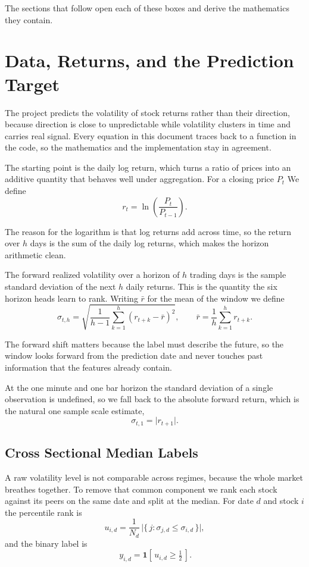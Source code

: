 \documentclass[12pt,letterpaper]{article}
\begin{document}
The sections that follow open each of these boxes and derive the mathematics
they contain.

\clearpage
\section{Data, Returns, and the Prediction Target}

The project predicts the volatility of stock returns rather than their
direction, because direction is close to unpredictable while volatility
clusters in time and carries real signal. Every equation in this document
traces back to a function in the code, so the mathematics and the
implementation stay in agreement.

The starting point is the daily log return, which turns a ratio of prices into
an additive quantity that behaves well under aggregation. For a closing price
$P_t$ We define
\[
r_t = \ln\!\left(\frac{P_t}{P_{t-1}}\right).
\]

The reason for the logarithm is that log returns add across time, so the return
over $h$ days is the sum of the daily log returns, which makes the horizon
arithmetic clean.

The forward realized volatility over a horizon of $h$ trading days is the
sample standard deviation of the next $h$ daily returns. This is the quantity
the six horizon heads learn to rank. Writing $\bar r$ for the mean of the window
we define
\[
\sigma_{t,h} = \sqrt{\frac{1}{h-1}\sum_{k=1}^{h} \left(r_{t+k} - \bar r\right)^2 },
\qquad
\bar r = \frac{1}{h}\sum_{k=1}^{h} r_{t+k}.
\]

The forward shift matters because the label must describe the future, so the
window looks forward from the prediction date and never touches past
information that the features already contain.

At the one minute and one bar horizon the standard deviation of a single
observation is undefined, so we fall back to the absolute forward return, which
is the natural one sample scale estimate,
\[
\sigma_{t,1} = \lvert r_{t+1} \rvert .
\]

\subsection{Cross Sectional Median Labels}

A raw volatility level is not comparable across regimes, because the whole
market breathes together. To remove that common component we rank each stock
against its peers on the same date and split at the median. For date $d$ and
stock $i$ the percentile rank is
\[
u_{i,d} = \frac{1}{N_d}\,\bigl\lvert\{\,j : \sigma_{j,d} \le \sigma_{i,d}\,\}\bigr\rvert,
\]
and the binary label is
\[
\boxed{\,y_{i,d} = \mathbf{1}\!\left[\,u_{i,d} \ge \tfrac{1}{2}\,\right].}
\]
\end{document}
